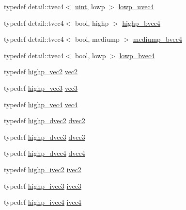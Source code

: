\begin{CompactItemize}
\item 
typedef detail::tvec4$<$ \hyperlink{group__core__precision_g4fd29415871152bfb5abd588334147c8}{uint}, lowp $>$ \hyperlink{group__core__precision_g17b5f652e5c64b0034065420d844fca7}{lowp\_\-uvec4}
\item 
typedef detail::tvec4$<$ bool, highp $>$ \hyperlink{group__core__precision_g381539af52c5e5c659700e12fb706eaf}{highp\_\-bvec4}
\item 
typedef detail::tvec4$<$ bool, mediump $>$ \hyperlink{group__core__precision_g8bb7cfe902e2cb356450d211ca4d58e2}{mediump\_\-bvec4}
\item 
typedef detail::tvec4$<$ bool, lowp $>$ \hyperlink{group__core__precision_g24c651dc8cb20779b3773428aef4f7f4}{lowp\_\-bvec4}
\item 
typedef \hyperlink{group__core__precision_g37645abcfcc1278567e99f1ca492bfbb}{highp\_\-vec2} \hyperlink{group__core__types_ga1618f51db67eaa145db101d8c8431d8}{vec2}
\item 
typedef \hyperlink{group__core__precision_g4879124da7a18d6b681d933cb8c4267d}{highp\_\-vec3} \hyperlink{group__core__types_g1c47e8b3386109bc992b6c48e91b0be7}{vec3}
\item 
typedef \hyperlink{group__core__precision_ge32d5f99860247afbe7ed90564bceac1}{highp\_\-vec4} \hyperlink{group__core__types_g5881b1b022d7fd1b7218f5916532dd02}{vec4}
\item 
typedef \hyperlink{group__core__precision_gcfbe8512142fff27f0bfb44958c1752f}{highp\_\-dvec2} \hyperlink{group__core__types_ge6727259898288cae197724d5f172b3b}{dvec2}
\item 
typedef \hyperlink{group__core__precision_g4962711854156dae8ebb4eb39237c542}{highp\_\-dvec3} \hyperlink{group__core__types_g7f3287f952e6ccb481231368091702ac}{dvec3}
\item 
typedef \hyperlink{group__core__precision_gd5ff5ff4a69e6925f5b4f540e2633835}{highp\_\-dvec4} \hyperlink{group__core__types_g0824ceed7ec3b2fba89765501c1540b5}{dvec4}
\item 
typedef \hyperlink{group__core__precision_gb2bac6095f51f7d7f74747afc2f6747a}{highp\_\-ivec2} \hyperlink{group__core__types_g9e6ce9cfc7919976b318197e18d8a065}{ivec2}
\item 
typedef \hyperlink{group__core__precision_ge9f0a321de8ee92dce9d4400362d71e7}{highp\_\-ivec3} \hyperlink{group__core__types_g6e12a4ca00d696f07da1df4eb73e0fe8}{ivec3}
\item 
typedef \hyperlink{group__core__precision_geba08fcf78aeae954c3335d73500ff8b}{highp\_\-ivec4} \hyperlink{group__core__types_ga4560ddc50320ea8f8a70d5c9c249fea}{ivec4}

\end{CompactItemize}
